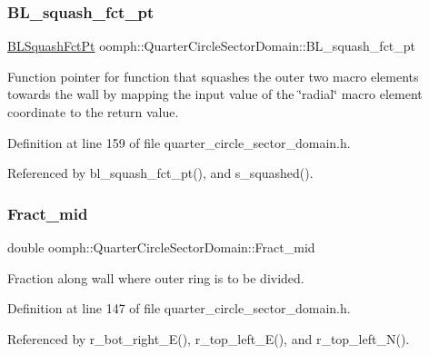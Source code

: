\subsubsection{\texorpdfstring{B\+L\+\_\+squash\+\_\+fct\+\_\+pt}{BL\_squash\_fct\_pt}}
{\footnotesize\ttfamily \hyperlink{classoomph_1_1QuarterCircleSectorDomain_a6cffab57f87c9f4ab01744647240bb1e}{B\+L\+Squash\+Fct\+Pt} oomph\+::\+Quarter\+Circle\+Sector\+Domain\+::\+B\+L\+\_\+squash\+\_\+fct\+\_\+pt\hspace{0.3cm}{\ttfamily [private]}}



Function pointer for function that squashes the outer two macro elements towards the wall by mapping the input value of the \char`\"{}radial\char`\"{} macro element coordinate to the return value. 



Definition at line 159 of file quarter\+\_\+circle\+\_\+sector\+\_\+domain.\+h.



Referenced by bl\+\_\+squash\+\_\+fct\+\_\+pt(), and s\+\_\+squashed().

\mbox{\label{classoomph_1_1QuarterCircleSectorDomain_ade78897c44c26af82ac90052f799796c}} 
\subsubsection{\texorpdfstring{Fract\+\_\+mid}{Fract\_mid}}
{\footnotesize\ttfamily double oomph\+::\+Quarter\+Circle\+Sector\+Domain\+::\+Fract\+\_\+mid\hspace{0.3cm}{\ttfamily [private]}}



Fraction along wall where outer ring is to be divided. 



Definition at line 147 of file quarter\+\_\+circle\+\_\+sector\+\_\+domain.\+h.



Referenced by r\+\_\+bot\+\_\+right\+\_\+\+E(), r\+\_\+top\+\_\+left\+\_\+\+E(), and r\+\_\+top\+\_\+left\+\_\+\+N().

\mbox{\label{classoomph_1_1QuarterCircleSectorDomain_a59722c43d41fef0bc3df4cf6571930a8}} 
